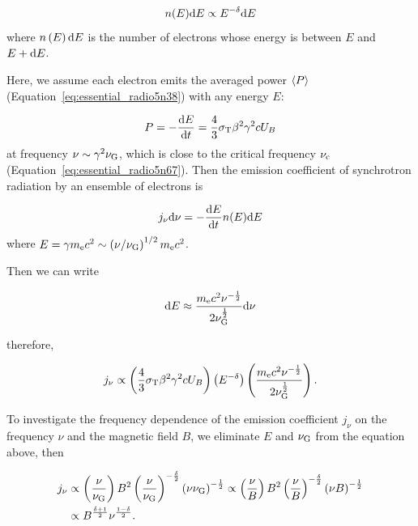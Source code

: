 \begin{equation}\label{eq:essential_radio5n70}
    n(E) \mathrm{d} E \propto E^{-\delta} \mathrm{d} E
\end{equation}
where $n\left(E\right)\mathrm{d} E$ is the number of electrons whose energy is between $E$ and $E+\mathrm{d} E$.

Here, we assume each electron emits the averaged power $\left\langle P\right\rangle$ (Equation~\ref{eq:essential_radio5n38}) with any energy $E$:

\begin{equation}\label{eq:essential_radio5n71}
    P=-\frac{\mathrm{d} E}{\mathrm{d} t}=\frac{4}{3} \sigma_{\mathrm{T}} \beta^2 \gamma^2 c U_B
\end{equation}
at frequency $\nu \sim \gamma^2\nu_{\mathrm{G}}$, which is close to the critical frequency $\nu_{\mathrm{c}}$ (Equation~\ref{eq:essential_radio5n67}).
Then the emission coefficient of synchrotron radiation by an ensemble of electrons is

\begin{equation}\label{eq:essential_radio5n73}
    j_{\nu} \mathrm{d} \nu=-\frac{\mathrm{d} E}{\mathrm{d} t} n(E) \mathrm{d} E
\end{equation}
where $E = \gamma m_{\mathrm{e}} c^2 \sim \left(\nu/\nu_{\mathrm{G}}\right)^{1/2} m_{\mathrm{e}}c^2$.

Then we can write

\begin{equation}\label{eq:essential_radio5n75}
    \mathrm{d} E \approx \frac{m_{\mathrm{e}} c^2 \nu^{-\frac{1}{2}}}{2 \nu_{\mathrm{G}}^{\frac{1}{2}}} \mathrm{d} \nu
\end{equation}

therefore,

\begin{equation}\label{eq:essential_radio5n76}
    j_{\nu} \propto\left(\frac{4}{3} \sigma_{\mathrm{T}} \beta^2 \gamma^2 c U_B\right)\left(E^{-\delta}\right)\left(\frac{m_{\mathrm{e}} c^2 \nu^{-\frac{1}{2}}}{2 \nu_{\mathrm{G}}^{\frac{1}{2}}}\right).
\end{equation}

To investigate the frequency dependence of the emission coefficient $j_{\nu}$ on the frequency $\nu$ and the magnetic field $B$, we eliminate  $E$ and $\nu_{\mathrm{G}}$ from the equation above, then

\begin{equation}\label{eq:essential_radio5n77}
    \begin{aligned}
        j_{\nu} & \propto \left(\frac{\nu}{\nu_{\mathrm{G}}}\right) B^2 \left(\frac{\nu}{\nu_{\mathrm{G}}}\right)^{-\frac{\delta}{2}} \left(\nu \nu_{\mathrm{G}}\right)^{-\frac{1}{2}} \propto \left(\frac{\nu}{B}\right) B^2 \left(\frac{\nu}{B}\right)^{-\frac{\delta}{2}} \left(\nu B\right)^{-\frac{1}{2}}\\
                & \propto B^{\frac{\delta+1}{2}} \nu^{\frac{1-\delta}{2}}.
    \end{aligned}
\end{equation}

